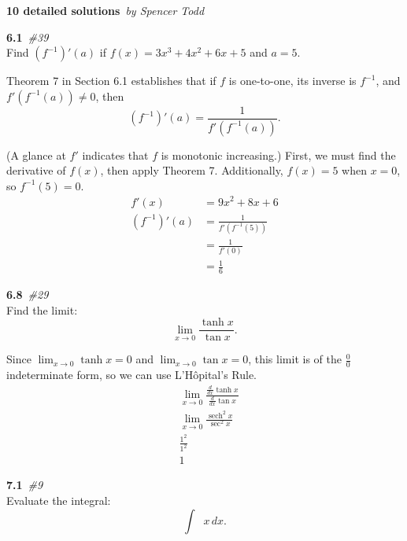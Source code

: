 \documentclass[12pt]{article}
\DeclareMathOperator{\sech}{sech}
\DeclareMathOperator{\invcos}{cos^{-1}}
\newcommand{\bfit}[2]{\textbf{#1}\ \textit{#2}}
\renewcommand{\title}[2]{\huge\bfit{#1}{#2}\normalsize}
\newcommand{\double}[0]{\par\null\par}
\renewcommand{\section}[2]{\double\LARGE\bfit{#1}{\##2}\normalsize\\}
\newcommand{\paren}[1]{\left({#1}\right)}
\let\xint\int
\renewcommand{\int}[2]{\xint{#1}\,d#2}
\begin{document}
\selectfont
\title{10 detailed solutions}{by Spencer Todd}
\section{6.1}{39}
Find $\paren{f^{-1}}'\paren{a}$ if $f\paren{x}=3x^3+4x^2+6x+5$ and $a=5$.\double

Theorem 7 in Section 6.1 establishes that if $f$ is one-to-one, its inverse is
$f^{-1}$, and \\$f'\paren{f^{-1}\paren{a}}\neq 0$, then
%
\begin{equation*}
\paren{f^{-1}}'\paren{a}=\frac{1}{f'\paren{f^{-1}\paren{a}}}.
\end{equation*}

(A glance at $f'$ indicates that $f$ is monotonic increasing.) First, we must find the derivative of $f\paren{x}$, then apply Theorem 7. Additionally, $f\paren{x}=5$ when $x=0$, so
$f^{-1}\paren{5}=0$.
%
\begin{align*}
f'\paren{x}&=9x^2+8x+6 \\
%
\paren{f^{-1}}'\paren{a}&=\frac{1}{f'\paren{f^{-1}\paren{5}}} \\
&=\frac{1}{f'\paren{0}} \\
&=\frac{1}{6}
\end{align*}

\section{6.8}{29}
Find the limit:
%
\begin{equation*}
\lim_{x\to 0}\frac{\tanh{x}}{\tan{x}}.
\end{equation*}\double

Since $\displaystyle\lim_{x\to 0}\tanh{x}=0$ and $\displaystyle\lim_{x\to 0}\tan{x}=0$, this limit is of the
$\frac{0}{0}$ indeterminate form, so we can use L'H\^{o}pital's Rule.
%
\begin{align*}
&\lim_{x\to 0}\frac{\frac{d}{dx}\tanh{x}}{\frac{d}{dx}\tan{x}} \\
&\lim_{x\to 0}\frac{\sech^2 x}{\sec^2 x} \\
&\frac{1^2}{1^2} \\
&1
\end{align*}

\section{7.1}{9}
Evaluate the integral:
%
\begin{equation*}
\int{\invcos{x}}{x}.
\end{equation*}\double
\end{document}

